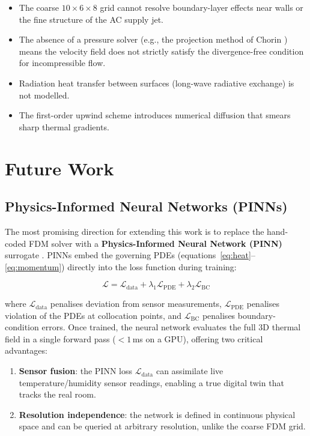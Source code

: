 \documentclass[12pt,a4paper]{report}
\begin{document}
\begin{itemize}
  \item The coarse $10\times6\times8$ grid cannot resolve boundary-layer effects near walls or the fine structure of the AC supply jet.
  \item The absence of a pressure solver (e.g., the projection method of Chorin \cite{chorin1968}) means the velocity field does not strictly satisfy the divergence-free condition for incompressible flow.
  \item Radiation heat transfer between surfaces (long-wave radiative exchange) is not modelled.
  \item The first-order upwind scheme introduces numerical diffusion that smears sharp thermal gradients.
\end{itemize}

\section{Future Work}
\label{sec:future}

\subsection{Physics-Informed Neural Networks (PINNs)}

The most promising direction for extending this work is to replace the hand-coded FDM solver with a \textbf{Physics-Informed Neural Network (PINN)} surrogate \cite{raissi2019}. PINNs embed the governing PDEs (equations~\ref{eq:heat}--\ref{eq:momentum}) directly into the loss function during training:

\begin{equation}
  \mathcal{L} = \mathcal{L}_\text{data} + \lambda_1\mathcal{L}_\text{PDE} + \lambda_2\mathcal{L}_\text{BC}
  \label{eq:pinn_loss}
\end{equation}

where $\mathcal{L}_\text{data}$ penalises deviation from sensor measurements, $\mathcal{L}_\text{PDE}$ penalises violation of the PDEs at collocation points, and $\mathcal{L}_\text{BC}$ penalises boundary-condition errors. Once trained, the neural network evaluates the full 3D thermal field in a single forward pass ($<1$\,ms on a GPU), offering two critical advantages:

\begin{enumerate}
  \item \textbf{Sensor fusion}: the PINN loss $\mathcal{L}_\text{data}$ can assimilate live temperature/humidity sensor readings, enabling a true digital twin that tracks the real room.
  \item \textbf{Resolution independence}: the network is defined in continuous physical space and can be queried at arbitrary resolution, unlike the coarse FDM grid.
\end{enumerate}
\end{document}
